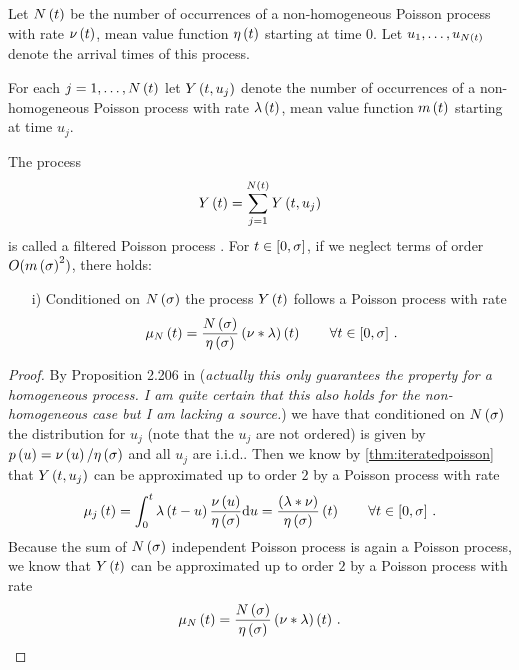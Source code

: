 \documentclass{amsart}
\numberwithin{equation}{section}
\begin{document}
\begin{theorem}\label{thm:twostagepoisson}
Let $N\left(t\right)$ be the number of occurrences of a non-homogeneous Poisson process with rate $\nu\left(t\right)$, mean value function $\eta\left(t\right)$ starting at time $0$. Let $u_1, \dots, u_{N\left(t\right)}$ denote the arrival times of this process.

For each $j = 1, \dots, N\left(t\right)$ let $Y\left(t, u_j\right)$ denote the number of occurrences of a non-homogeneous Poisson process with rate $\lambda\left(t\right)$, mean value function $m\left(t\right)$ starting at time $u_j$.

The process
\[
    Y\left(t\right) = \sum_{j=1}^{N\left(t\right)} Y\left(t, u_j\right)
\]{}
is called a filtered Poisson process \cite[chapter 4, eqn. (5.42)]{parzen1962stochastic}.
For $t \in \left[0, \sigma\right]$, if we neglect terms of order $O(m\left(\sigma\right)^2)$, there holds:

\begin{enumerate}
\item[i)] Conditioned on $N\left(\sigma\right)$ the process $Y\left(t\right)$ follows a Poisson process with rate
\[
    \mu_{N}\left(t\right) = \frac{N\left(\sigma\right)}{\eta\left(\sigma\right)} \left(\nu \ast \lambda\right)\left(t\right) \qquad \forall t \in \left[0, \sigma\right] \, .
\]
\end{enumerate}
\end{theorem}
\begin{proof}
By Proposition 2.206 in \cite[p. 147]{intro2015Stoch} (\emph{actually this only guarantees the property for a homogeneous process. I am quite certain that this also holds for the non-homogeneous case but I am lacking a source.}) we have that conditioned on $N\left(\sigma\right)$ the distribution for $u_j$ (note that the $u_j$ are not ordered) is given by $p\left(u\right) = \nu\left(u\right) / \eta\left(\sigma\right)$ and all $u_j$ are i.i.d.. Then we know by \autoref{thm:iteratedpoisson} that $Y\left(t, u_j\right)$ can be approximated up to order $2$ by a Poisson process with rate
\begin{equation*}
\mu_j\left(t\right) = \int_0^t\lambda\left(t-u\right) \frac{\nu\left(u\right)}{\eta\left(\sigma\right)} \mathrm{d}u = \frac{\left(\lambda \ast \nu\right)}{\eta\left(\sigma\right)} \left(t\right) \qquad \forall t \in \left[0, \sigma\right] \, .
\end{equation*}
Because the sum of $N\left(\sigma\right)$ independent Poisson process is again a Poisson process, we know that $Y\left(t\right)$ can be approximated up to order $2$ by a Poisson process with rate
\[
    \mu_{N}\left(t\right) = \frac{N\left(\sigma\right)}{\eta\left(\sigma\right)} \left(\nu \ast \lambda\right)\left(t\right) \, .
\]{}
\end{proof}
\end{document}
